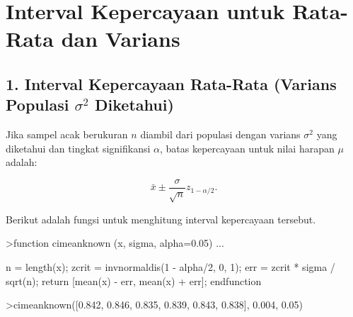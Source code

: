 \documentclass[a4paper,11pt,oneside,enabledeprecatedfontcommands]{scrbook}
\newenvironment{eulernotebook}{}{}
\newcommand{\eulerheading}[1]{\chapter{#1}}
\newcommand{\eulersubheading}[1]{\section{#1}}
\newenvironment{eulercomment}{\par\medskip\noindent}{\par\medskip}
\newenvironment{eulerformula}{}{}
\begin{document}
\begin{eulernotebook}
		\eulerheading{Interval Kepercayaan untuk Rata-Rata dan Varians}
		\eulersubheading{1. Interval Kepercayaan Rata-Rata (Varians Populasi $\sigma^2$ Diketahui)}
		\begin{eulercomment}
			Jika sampel acak berukuran $n$ diambil dari populasi dengan varians $\sigma^2$ yang diketahui dan tingkat
			signifikansi $\alpha$, batas kepercayaan untuk nilai harapan $\mu$ adalah:
		\end{eulercomment}
		\begin{eulerformula}
			\[
			\bar{x} \pm \frac{\sigma}{\sqrt{n}} z_{1-\alpha/2}.
			\]
		\end{eulerformula}
		\begin{eulercomment}
			Berikut adalah fungsi untuk menghitung interval kepercayaan tersebut.
		\end{eulercomment}
		\begin{eulerprompt}
			>function cimeanknown (x, sigma, alpha=0.05) ...
		\end{eulerprompt}
		\begin{eulerudf}
			n = length(x);
			zcrit = invnormaldis(1 - alpha/2, 0, 1);
			err = zcrit * sigma / sqrt(n);
			return [mean(x) - err, mean(x) + err];
			endfunction
		\end{eulerudf}
		\begin{eulerprompt}
			>cimeanknown([0.842, 0.846, 0.835, 0.839, 0.843, 0.838], 0.004, 0.05)
		\end{eulerprompt}
		\begin{euleroutput}
			[0.8373,  0.8437]
		\end{euleroutput}
		

\end{eulernotebook}
\end{document}
